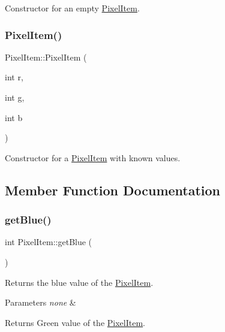 Constructor for an empty \hyperlink{class_pixel_item}{Pixel\+Item}. \mbox{\label{class_pixel_item_a30a86eed2bb2bf489da77a6b193488a3}} 
\subsubsection{\texorpdfstring{Pixel\+Item()}{PixelItem()}\hspace{0.1cm}{\footnotesize\ttfamily [2/2]}}
{\footnotesize\ttfamily Pixel\+Item\+::\+Pixel\+Item (\begin{DoxyParamCaption}\item[{int}]{r,  }\item[{int}]{g,  }\item[{int}]{b }\end{DoxyParamCaption})}

Constructor for a \hyperlink{class_pixel_item}{Pixel\+Item} with known values. 

\subsection{Member Function Documentation}
\mbox{\label{class_pixel_item_a5494bd00a58a69b4f36eaaa4048b488a}} 
\subsubsection{\texorpdfstring{get\+Blue()}{getBlue()}}
{\footnotesize\ttfamily int Pixel\+Item\+::get\+Blue (\begin{DoxyParamCaption}{ }\end{DoxyParamCaption})}

Returns the blue value of the \hyperlink{class_pixel_item}{Pixel\+Item}.


\begin{DoxyParams}{Parameters}
{\em none} & \\
\hline
\end{DoxyParams}
\begin{DoxyReturn}{Returns}
Green value of the \hyperlink{class_pixel_item}{Pixel\+Item}. 
\end{DoxyReturn}
\mbox{\label{class_pixel_item_af27ddba28beb8398433751366dd00fe6}} 
